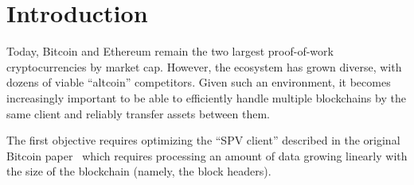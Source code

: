\section{Introduction}



%
Today, Bitcoin and Ethereum remain the two largest proof-of-work
cryptocurrencies by market cap. However, the ecosystem has grown diverse, with
dozens of viable ``altcoin'' competitors.
%
Given such an environment,  it becomes increasingly  important to be able to
efficiently handle  multiple blockchains by the same client and reliably
transfer assets between them.
%
%
%

The first objective requires optimizing the ``SPV client'' described in the
original Bitcoin paper~\cite{bitcoin} which requires processing an amount of
data growing linearly with the size of the blockchain (namely, the block
headers).
%

